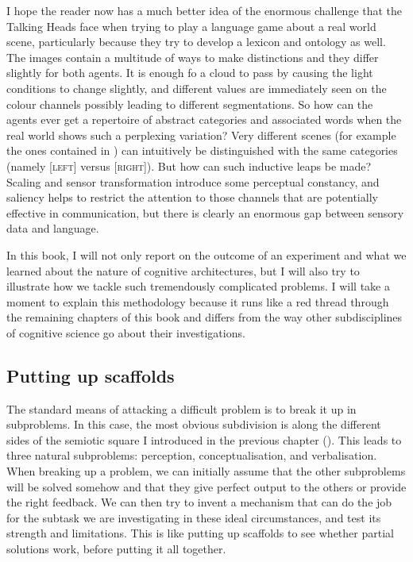 I hope the reader now has a much better idea of the enormous challenge
that the Talking Heads face when trying to play a language 
game about a real world scene, particularly
because they try to develop a lexicon and ontology 
as well. The images contain a multitude of ways 
to make distinctions and they differ slightly for both agents. 
It is enough fo a cloud to pass by causing the light conditions
to change slightly, and different values are immediately seen 
on the colour channels possibly leading to different segmentations.
So how can the agents ever get a repertoire of abstract categories and 
associated words when the real world shows such a perplexing 
variation? Very different scenes (for example the ones contained
in ) can intuitively be distinguished with the same 
categories (namely [\textsc{left}] versus [\textsc{right}]). But how can such 
inductive leaps be made? Scaling and sensor transformation 
introduce some perceptual constancy, and saliency helps to 
restrict the attention to those
channels that are potentially effective in communication, but there 
is clearly an enormous gap between sensory data and language. 

In this book, I will 
not only report on the outcome of an experiment and 
what we learned about the nature of cognitive architectures, but 
I will also try
to illustrate how we tackle such tremendously complicated problems. 
I will take a moment to explain this methodology because it runs like 
a red thread through the remaining chapters of this book and 
differs from the way other subdisciplines of cognitive science 
go about their investigations. 

\subsection{Putting up scaffolds}

The standard means of attacking a difficult problem is to 
break it up in subproblems. In this case, the most obvious
subdivision is along the different sides
of the semiotic square I introduced in the 
previous chapter (). This 
leads to three natural subproblems: perception, conceptualisation, 
and verbalisation. When breaking up a problem, we can initially assume that the 
other subproblems will be solved somehow and that they give perfect
output to the others
or provide the right feedback. We can then try to invent a mechanism that
can do the job for the subtask we are investigating in these ideal circumstances, 
and test its strength and limitations. This is like putting up
scaffolds to see whether partial solutions work, before putting 
it all together. 

